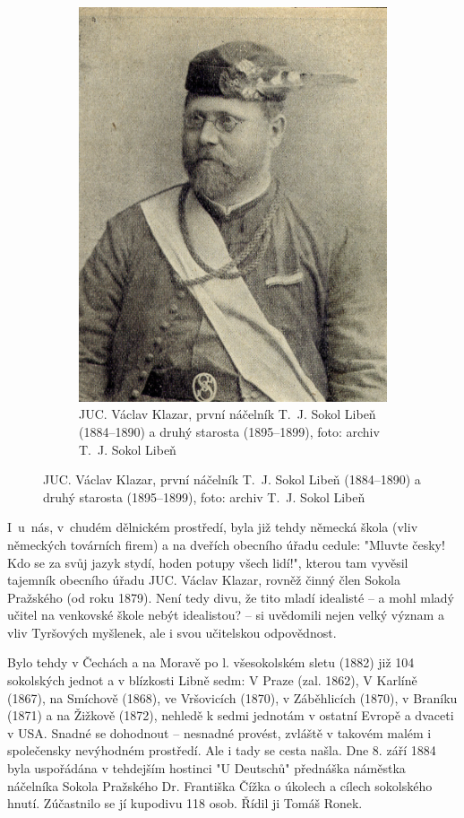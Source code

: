 \documentclass[a5paper, 12pt, twoside]{article}
\begin{document}
\begin{figure}[h]
\begin{subfigure}{0.45\textwidth}
  \includegraphics[width=\textwidth]{img/klazar.jpg}
  \caption*{JUC. Václav Klazar, první náčelník T.~J. Sokol Libeň (1884–⁠⁠⁠⁠⁠⁠1890) a druhý starosta (1895–⁠⁠⁠⁠⁠⁠1899), foto: archiv T.~J. Sokol Libeň}
  \end{subfigure}
\end{figure}

I~u~nás, v~chudém dělnickém prostředí, byla již tehdy německá škola (vliv německých továrních firem) a na dveřích obecního úřadu cedule: "Mluvte česky! Kdo se za svůj jazyk stydí, hoden potupy všech lidí!", kterou tam vyvěsil tajemník obecního úřadu JUC. Václav Klazar, rovněž činný člen Sokola Pražského (od roku 1879). Není tedy divu, že tito mladí idealisté – a mohl mladý učitel na venkovské škole nebýt idealistou? – si uvědomili nejen velký význam a vliv Tyršových myšlenek, ale i svou učitelskou odpovědnost.

Bylo tehdy v Čechách a na Moravě po l. všesokolském sletu (1882) již 104 sokolských jednot a v blízkosti Libně sedm: V Praze (zal. 1862), V Karlíně (1867), na Smíchově (1868), ve Vršovicích (1870), v Záběhlicích (1870), v Braníku (1871) a na Žižkově (1872), nehledě k sedmi jednotám v ostatní Evropě a dvaceti v USA. Snadné se dohodnout -- nesnadné provést, zvláště v takovém malém i společensky nevýhodném prostředí. Ale i tady se cesta našla. Dne 8. září 1884 byla uspořádána v tehdejším hostinci "U Deutschů" přednáška náměstka náčelníka Sokola Pražského Dr. Františka Čížka o úkolech a cílech sokolského hnutí. Zúčastnilo se jí kupodivu 118 osob. Řídil ji Tomáš Ronek.
\end{document}

